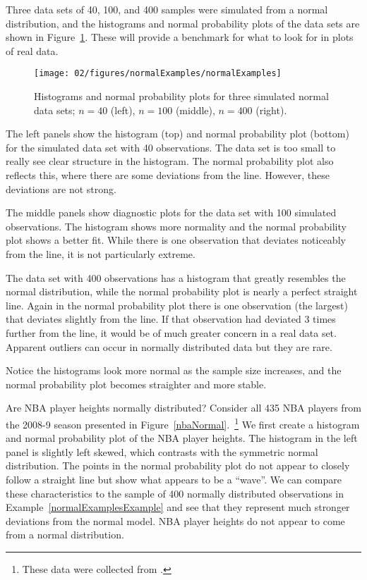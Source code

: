 \begin{example}{Three data sets of 40, 100, and 400 samples were simulated from a normal distribution, and the histograms and normal probability plots of the data sets are shown in Figure~\ref{normalExamples}. These will provide a benchmark for what to look for in plots of real data.} \label{normalExamplesExample}

\begin{figure}
\centering
\texttt{[image: 02/figures/normalExamples/normalExamples]}
\caption{Histograms and normal probability plots for three simulated normal data sets; $n=40$ (left), $n=100$ (middle), $n=400$ (right).}
\label{normalExamples}
\end{figure}

The left panels show the histogram (top) and normal probability plot (bottom) for the simulated data set with 40 observations. The data set is too small to really see clear structure in the histogram. The normal probability plot also reflects this, where there are some deviations from the line. However, these deviations are not strong.

The middle panels show diagnostic plots for the data set with 100 simulated observations. The histogram shows more normality and the normal probability plot shows a better fit. While there is one observation that deviates noticeably from the line, it is not particularly extreme.

The data set with 400 observations has a histogram that greatly resembles the normal distribution, while the normal probability plot is nearly a perfect straight line. Again in the normal probability plot there is one observation (the largest) that deviates slightly from the line. If that observation had deviated 3 times further from the line, it would be of much greater concern in a real data set. Apparent outliers can occur in normally distributed data but they are rare.

Notice the histograms look more normal as the sample size increases, and the normal probability plot becomes straighter and more stable.
\end{example}

\begin{example}{Are NBA player heights normally distributed? Consider all 435 NBA players from the 2008-9 season presented in Figure~\ref{nbaNormal}.~\footnote{These data were collected from .}}
We first create a histogram and normal probability plot of the NBA player heights. The histogram in the left panel is slightly left skewed, which contrasts with the symmetric normal distribution. The points in the normal probability plot do not appear to closely follow a straight line but show what appears to be a ``wave''. We can compare these characteristics to the sample of 400 normally distributed observations in Example~\ref{normalExamplesExample} and see that they represent much stronger deviations from the normal model. NBA player heights do not appear to come from a normal distribution.
\end{example}

